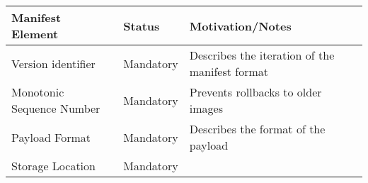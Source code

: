 \begin{longtable}[]{@{}lll@{}}
\toprule
\begin{minipage}[b]{0.23\columnwidth}\raggedright\strut
Manifest Element\strut
\end{minipage} & \begin{minipage}[b]{0.26\columnwidth}\raggedright\strut
Status\strut
\end{minipage} & \begin{minipage}[b]{0.42\columnwidth}\raggedright\strut
Motivation/Notes\strut
\end{minipage}\tabularnewline
\midrule
\endhead
\begin{minipage}[t]{0.23\columnwidth}\raggedright\strut
Version identifier\strut
\end{minipage} & \begin{minipage}[t]{0.26\columnwidth}\raggedright\strut
Mandatory\strut
\end{minipage} & \begin{minipage}[t]{0.42\columnwidth}\raggedright\strut
Describes the iteration of the manifest format\strut
\end{minipage}\tabularnewline
\begin{minipage}[t]{0.23\columnwidth}\raggedright\strut
Monotonic Sequence Number\strut
\end{minipage} & \begin{minipage}[t]{0.26\columnwidth}\raggedright\strut
Mandatory\strut
\end{minipage} & \begin{minipage}[t]{0.42\columnwidth}\raggedright\strut
Prevents rollbacks to older images\strut
\end{minipage}\tabularnewline
\begin{minipage}[t]{0.23\columnwidth}\raggedright\strut
Payload Format\strut
\end{minipage} & \begin{minipage}[t]{0.26\columnwidth}\raggedright\strut
Mandatory\strut
\end{minipage} & \begin{minipage}[t]{0.42\columnwidth}\raggedright\strut
Describes the format of the payload\strut
\end{minipage}\tabularnewline
\begin{minipage}[t]{0.23\columnwidth}\raggedright\strut
Storage Location\strut
\end{minipage} & \begin{minipage}[t]{0.26\columnwidth}\raggedright\strut
Mandatory\strut
\end{minipage} & \begin{minipage}[t]{0.42\columnwidth}\raggedright\strut

\end{minipage}
\end{longtable}
